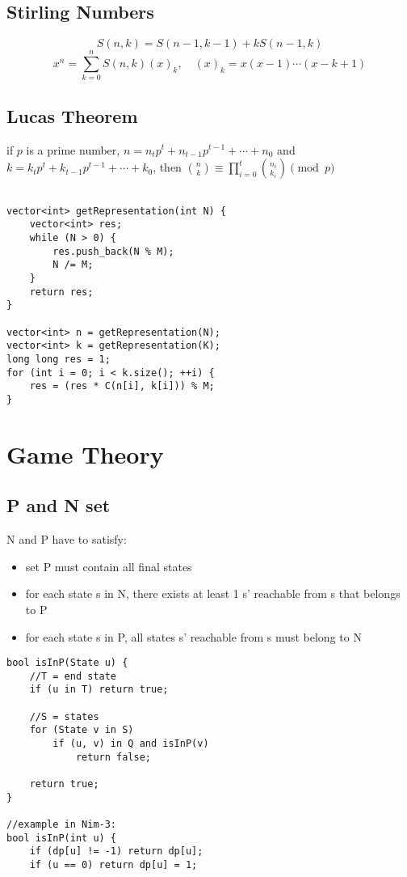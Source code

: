 \documentclass[11pt,a4paper]{article}
\begin{document}
\begin{multicols*}{2}
\subsection{Stirling Numbers}
\[
S(n,k) = S(n-1,k-1) + k S(n-1,k)
\]
\[
x^n = \sum_{k=0}^n S(n,k)(x)_k, \quad (x)_k = x(x-1)\cdots(x-k+1)
\]

\subsection{Lucas Theorem}
if $p$ is a prime number, $n = n_t p^t + n_{t-1} p^{t-1} + \cdots + n_0$
and $k = k_t p^t + k_{t-1} p^{t-1} + \cdots + k_0$, 
then $\binom{n}{k} \equiv \prod_{i=0}^{t} \binom{n_i}{k_i} \pmod{p}$
\begin{lstlisting}

vector<int> getRepresentation(int N) {
    vector<int> res;
    while (N > 0) {
        res.push_back(N % M);
        N /= M;
    }
    return res;
}

vector<int> n = getRepresentation(N);
vector<int> k = getRepresentation(K);
long long res = 1;
for (int i = 0; i < k.size(); ++i) {
    res = (res * C(n[i], k[i])) % M;
}
\end{lstlisting}

\section{Game Theory}
\subsection{P and N set}
N and P have to satisfy:
\begin{itemize}
    \item set P must contain all final states
    \item for each state s in N, there exists at least 1 s' reachable from s that belongs to P
    \item for each state s in P, all states s' reachable from s must belong to N
\end{itemize}
\begin{lstlisting}
bool isInP(State u) {
    //T = end state
    if (u in T) return true;

    //S = states
    for (State v in S)
        if (u, v) in Q and isInP(v)
            return false; 

    return true; 
}

//example in Nim-3:
bool isInP(int u) {
    if (dp[u] != -1) return dp[u];
    if (u == 0) return dp[u] = 1;
    

\end{lstlisting}
\end{multicols*}
\end{document}
